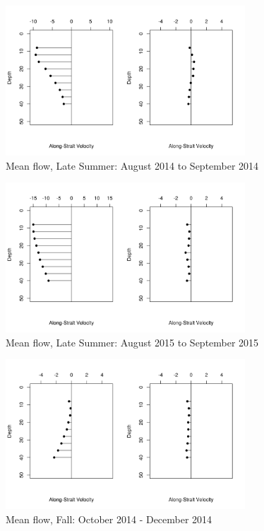 \documentclass[12pt]{dforeport}
\begin{document}
\begin{figure}  
\centering
\includegraphics[width = 0.8\textwidth]{./figures/38_smf_lateSummer_2014.png}
\caption[Mean flow, Late Summer, 2014]{Mean flow, Late Summer: August 2014 to September 2014}
\label{f:smf_ls_2014}
\end{figure}

\begin{figure}  
\centering
\includegraphics[width = 0.8\textwidth]{./figures/39_smf_lateSummer_2015.png}
\caption[Mean flow, Late Summer, 2015]{Mean flow, Late Summer: August 2015 to September 2015}
\label{f:smf_ls_2015}
\end{figure}


\begin{figure}  
\centering
\includegraphics[width = 0.8\textwidth]{./figures/40_smf_fall_2014.png}
\caption[Mean flow, Fall, 2014]{Mean flow, Fall: October 2014 - December 2014}
\label{f:smf_f_2014}
\end{figure}
\end{document}
